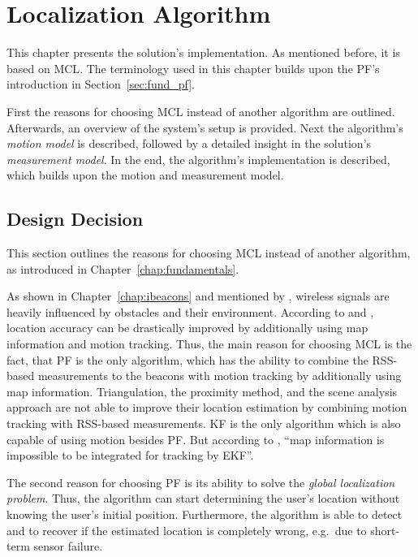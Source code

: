 \chapter{Localization Algorithm} \label{chap:pf}
This chapter presents the solution's implementation. As mentioned before, it is based on \acf{MCL}. The terminology used in this chapter builds upon the \acs{PF}'s introduction in Section~\ref{sec:fund_pf}.

First the reasons for choosing \acs{MCL} instead of another algorithm are outlined. Afterwards, an overview of the system's setup is provided. Next the algorithm's \emph{motion model} is described, followed by a detailed insight in the solution's \emph{measurement model}. In the end, the algorithm's implementation is described, which builds upon the motion and measurement model.


\section{Design Decision} \label{sec:algo_decision}
This section outlines the reasons for choosing \acl{MCL} instead of another algorithm, as introduced in Chapter~\ref{chap:fundamentals}.

As shown in Chapter~\ref{chap:ibeacons} and mentioned by \citet{IEEE:survey_wireless_indoor_pos}, wireless signals are heavily influenced by obstacles and their environment. According to \citet{wang:wlan} and \citet{siddiqi:experiments_mcl_wifi}, location accuracy can be drastically improved by additionally using map information and motion tracking. Thus, the main reason for choosing \ac{MCL} is the fact, that \acl{PF} is the only algorithm, which has the ability to combine the \acs{RSS}-based measurements to the beacons with motion tracking by additionally using map information. Triangulation, the proximity method, and the scene analysis approach are not able to improve their location estimation by combining motion tracking with \ac{RSS}-based measurements. \acl{KF} is the only algorithm which is also capable of using motion besides \ac{PF}. But according to \citet{wang:wlan}, ``map information is impossible to be integrated for tracking by \acs{EKF}''.

The second reason for choosing \acs{PF} is its ability to solve the \emph{global localization problem}. Thus, the algorithm can start determining the user's location without knowing the user's initial position. Furthermore, the algorithm is able to detect and to recover if the estimated location is completely wrong, e.g.\ due to short-term sensor failure.

